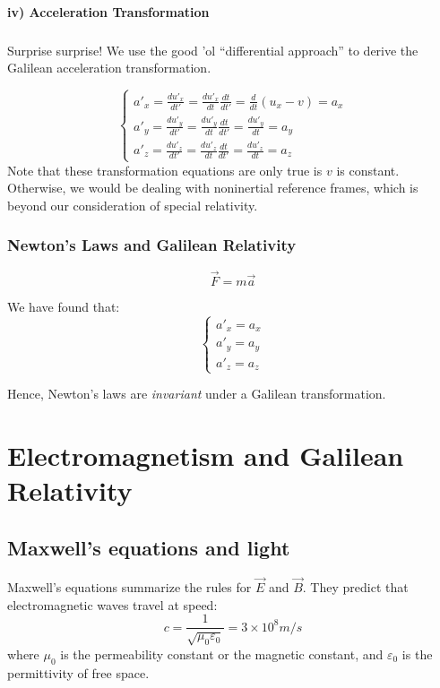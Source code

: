 \documentclass[a4paper,11pt]{article}
\numberwithin{equation}{section}
\begin{document}
 \paragraph{\indent iv) Acceleration Transformation}
 \subparagraph{}
 Surprise surprise! We use the good 'ol ``differential approach'' to derive the Galilean acceleration transformation.
 
  \begin{equation} \label{eq:22}
  \begin{cases} 
  a'_{x}=\frac{du'_{x}}{dt'}=\frac{du'_{x}}{dt}\frac{dt}{dt'}=\frac{d}{dt}{(u_{x}-v)}=a_{x} \\
  a'_{y}=\frac{du'_{y}}{dt'}=\frac{du'_{y}}{dt}\frac{dt}{dt'}=\frac{du'_{y}}{dt}=a_{y} \\ 
  a'_{z}=\frac{du'_{z}}{dt'}=\frac{du'_{z}}{dt}\frac{dt}{dt'}=\frac{du'_{z}}{dt}=a_{z}
  \end{cases}
  \end{equation}
  Note that these transformation equations are only true is $v$ is constant. Otherwise, we would be dealing with noninertial reference frames, which is beyond our consideration of special relativity. 
 
 \subsubsection{Newton's Laws and Galilean Relativity}
 
 \begin{equation} \label{eq:23}
 \vec{F} = m\vec{a}
 \end{equation}
 
 \noindent We have found that:
  \begin{equation} \label{eq:24}
  \begin{cases} 
  a'_{x}=a_{x} \\
  a'_{y}=a_{y} \\ 
  a'_{z}=a_{z}
  \end{cases}
  \end{equation}
  
 \noindent Hence, Newton's laws are \textit{invariant} under a Galilean transformation.
 
 \section{Electromagnetism and Galilean Relativity}
 
 \subsection{Maxwell's equations and light}
 Maxwell's equations summarize the rules for $\vec{E}$ and $\vec{B}$. They predict that electromagnetic waves travel at speed:
 \begin{equation}\label{eq:2.1}
 c = \frac{1}{\sqrt{\mu_{0}\varepsilon_{0}}} = 3\times10^{8} m/s
 \end{equation}
 where $\mu_{0}$ is the permeability constant or the magnetic constant, and $\varepsilon_{0}$ is the permittivity of free space. 
 
\end{document}
